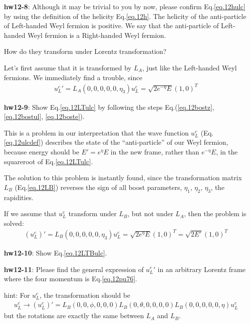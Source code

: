 \documentclass[12pt]{article}
\begin{document}
{\bf hw12-8}: Although it may be trivial to you by now, please confirm Eq.\ref{eq.12hulc} by using the definition of the helicity Eq.\ref{eq.12h}.
  The helicity of the anti-particle of Left-handed Weyl fermion is
  positive.  We say that the anti-particle of Left-handed Weyl fermion
  is a Right-handed Weyl fermion.

  How do they transform under Lorentz transformation?

  Let's first assume that it is transformed by $L_A$, just like the
  Left-handed Weyl fermions.  We immediately find a trouble, since
\begin{eqnarray}
  {u_L^c}'
  = L_A(0,0,0,0,0,\eta_3) u_L^c
  = \sqrt{ 2e^{-\eta} E } (1,0)^T \label{eq.12LTulc}
\end{eqnarray}

{\bf hw12-9}: Show Eq.\ref{eq.12LTulc} by following the steps Eq.(\ref{eq.12bostz}, \ref{eq.12bostul}, \ref{eq.12boste}).

  This is a problem in our interpretation that the wave function
  $u_L^c$ (Eq.\ref{eq.12ulcdef}) describes the state of the ``anti-particle'' of our Weyl fermion, because energy should be $E' = e^\eta E$ in the new frame, rather than $e^{-\eta} E$, in the squareroot of Eq.\ref{eq.12LTulc}.

  The solution to this problem is instantly found, since the
  transformation matrix $L_B$ (Eq.\ref{eq.12LB}) reverses the sign of all boost
  parameters, $\eta_1$, $\eta_2$, $\eta_3$, the rapidities.

  If we assume that $u_L^c$ transform under $L_B$, but not under $L_A$, then
  the problem is solved:
\begin{eqnarray}
  (u_L^c)'
  = L_B(0,0,0,0,0,\eta_3) u_L^c
  = \sqrt{2e^{\eta} E } (1,0)^T
  = \sqrt{ 2E' }         (1,0)^T \label{eq.12LTBulc}
\end{eqnarray}

{\bf hw12-10}: Show Eq.\ref{eq.12LTBulc}.

{\bf hw12-11}: Please find the general expression of ${u_L^c}'$ in an arbitrary
  Lorentz frame where the four momentum is Eq.\ref{eq.12pu76}.

hint: For $u_L^c$, the transformation should be
\begin{eqnarray}
  u_L^c \to (u_L^c)'
  =
  L_B(0,0,\phi,0,0,0) L_B(0,\theta,0,0,0,0) L_B(0,0,0,0,0,\eta) u_L^c
\end{eqnarray}
  but the rotations are exactly the same between $L_A$ and $L_B$.
\end{document}
